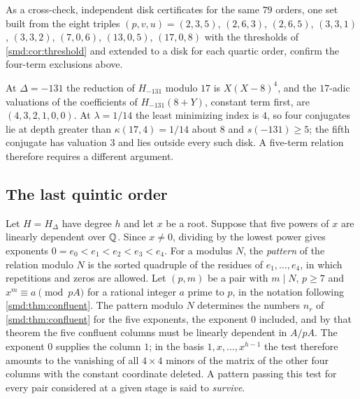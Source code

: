 
As a cross-check, independent disk certificates for the same $79$ orders, one set built
from the eight triples $(p,v,u)=(2,3,5)$, $(2,6,3)$, $(2,6,5)$, $(3,3,1)$, $(3,3,2)$,
$(7,0,6)$, $(13,0,5)$, $(17,0,8)$ with the thresholds of \cref{smd:cor:threshold} and
extended to a disk for each quartic order, confirm the four-term exclusions above.

At $\Delta=-131$ the reduction of $H_{-131}$ modulo $17$ is $X(X-8)^4$, and the
$17$-adic valuations of the coefficients of $H_{-131}(8+Y)$, constant term first, are
$(4,3,2,1,0,0)$. At $\lambda=1/14$ the least minimizing index is $4$, so four conjugates
lie at depth greater than $\kappa(17,4)=1/14$ about $8$ and $s(-131)\ge5$; the fifth
conjugate has valuation $3$ and lies outside every such disk. A five-term relation
therefore requires a different argument.

\subsection{The last quintic order}\label{smd:sec:quintic}
{\raggedright{}}

Let $H=H_\Delta$ have degree $h$ and let $x$ be a root. Suppose that five powers of $x$
are linearly dependent over $\mathbb{Q}$. Since $x\ne0$, dividing by the lowest power gives
exponents $0=e_0<e_1<e_2<e_3<e_4$. For a modulus $N$, the \emph{pattern} of the relation
modulo $N$ is the sorted quadruple of the residues of $e_1,\dots,e_4$, in which
repetitions and zeros are allowed. Let $(p,m)$ be a pair with $m\mid N$, $p\ge7$ and
$x^m\equiv a\pmod{pA}$ for a rational integer $a$ prime to $p$, in the notation following
\cref{smd:thm:confluent}. The pattern modulo $N$ determines the numbers $n_r$ of
\cref{smd:thm:confluent} for the five exponents, the exponent $0$ included, and by that
theorem the five confluent columns must be linearly dependent in $A/pA$. The exponent $0$
supplies the column $1$; in the basis $1,x,\dots,x^{h-1}$ the test therefore amounts to
the vanishing of all $4\times4$ minors of the matrix of the other four columns with the
constant coordinate deleted. A pattern passing this test for every pair considered at a
given stage is said to \emph{survive}.

